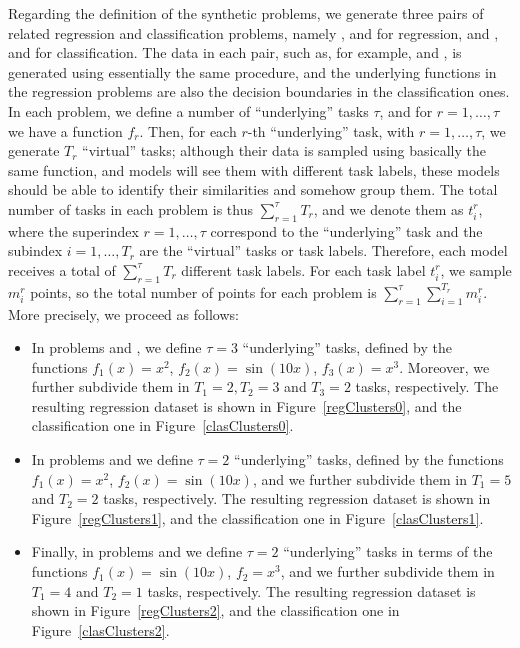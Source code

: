 Regarding the definition of the synthetic problems, we generate three pairs of related regression and classification problems, namely ,  and  for regression, and ,  and  for classification.
The data in each pair, such as, for example,  and , is generated using essentially the same procedure, and the underlying functions in the regression problems are also the decision boundaries in the classification ones.
%
In each problem, we define a number of ``underlying'' tasks $\tau$, and for $r=1, \ldots, \tau$ we have a function $f_r$.
Then, for each $r$-th ``underlying'' task, with $r=1, \ldots, \tau$, we generate $T_r$ ``virtual'' tasks; although their data is sampled using basically the same function, and models will see them with different task labels, these models should be able to identify their similarities and somehow group them.
%
The total number of tasks in each problem is thus $\sum_{r=1}^{\tau} T_r$, and we denote them as $t_i^r$, where the superindex $r=1, \ldots, \tau$ correspond to the ``underlying'' task and the subindex $i=1, \ldots, T_r$ are the ``virtual'' tasks or task labels. Therefore, each model receives a total of $\sum_{r=1}^\tau T_r$ different task labels.
%
For each task label $t_i^r$, we sample $m_i^r$ points, so the total number of points for each problem is $\sum_{r=1}^\tau \sum_{i=1}^{T_r} m_i^r$.
%
More precisely, we proceed as follows:
\begin{itemize}
    \item In problems  and , we define $\tau=3$ ``underlying'' tasks, defined by the functions $f_1(x) = x^2$,  $f_2(x) = \sin(10x)$, $f_3(x) = x^3$. Moreover, we further subdivide them in $T_1 = 2, T_2 = 3$ and $T_3 = 2$ tasks, respectively. The resulting regression dataset is shown in Figure~\ref{regClusters0}, and the classification one in Figure~\ref{clasClusters0}. 
    \item In problems  and  we define $\tau=2$ ``underlying'' tasks, defined by the functions $f_1(x) = x^2$,  $f_2(x) = \sin(10x)$, and we further subdivide them in
    $T_1 = 5$ and $T_2 = 2$ tasks, respectively. The resulting regression dataset is shown in Figure~\ref{regClusters1}, and the classification one in Figure~\ref{clasClusters1}. 
    \item Finally, in problems  and  we define $\tau=2$ ``underlying'' tasks in terms of the functions $f_1(x) = \sin(10x)$, $f_2 = x^3$, and we further subdivide them in
    $T_1 = 4$ and $T_2 = 1$ tasks, respectively. The resulting regression dataset is shown in Figure~\ref{regClusters2}, and the classification one in Figure~\ref{clasClusters2}.
\end{itemize}
